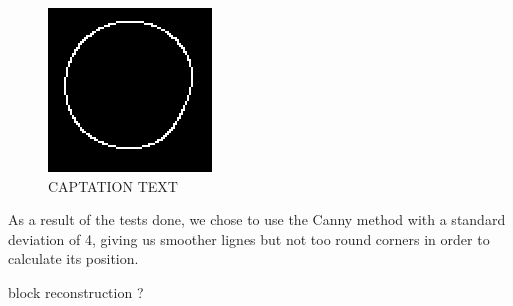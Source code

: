   	\begin{figure}[hb]
  \centering
  \includegraphics[scale=0.5]{figures/Canny_25.png}
  \caption[LABEL] {CAPTATION TEXT}
\end{figure}	
	

As a result of the tests done, we chose to use the Canny method with a standard deviation of 4, giving us smoother lignes but not too round corners in order to calculate its position.


\begin{flushleft}
 block reconstruction ?
 \end{flushleft}

 